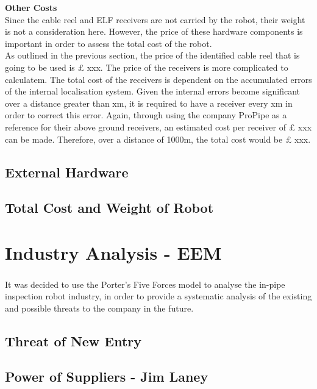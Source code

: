 \documentclass[11pt]{article}		%
\newcommand{\supercite}[1]{\textsuperscript{\cite{#1}}}		%
\begin{document}
        \textbf{Other Costs}\\

        
        Since the cable reel and ELF receivers are not carried by the robot, their weight is not a consideration here. However, the price of these hardware components is important in order to assess the total cost of the robot. \\
	    \hspace*{3ex}As outlined in the previous section, the price of the identified cable reel that is going to be used is £ xxx. The price of the receivers is more complicated to calculatem. The total cost of the receivers is dependent on the accumulated errors of the internal localisation system. Given the internal errors become significant over a distance greater than xm, it is required to have a receiver every xm in order to correct this error. Again, through using the company ProPipe as a reference for their above ground receivers, an estimated cost per receiver of £ xxx can be made. Therefore, over a distance of 1000m, the total cost would be £ xxx. 




		\subsection{External Hardware}
		
		\subsection{Total Cost and Weight of Robot}
			
	\section{Industry Analysis - EEM}
		
		It was decided to use the Porter's Five Forces model\supercite{porter2008five} to analyse the in-pipe inspection robot industry, in order to provide a systematic analysis of the existing and possible threats to the company in the future.
		
		\subsection[Threat of New Entry]{Threat of New Entry}
				
		\subsection[Power of Suppliers]{Power of Suppliers - Jim Laney}
			
\end{document}
